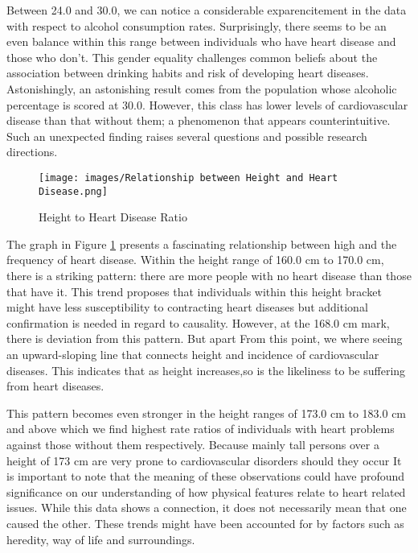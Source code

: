 \documentclass[12pt, a4paper,twoside]{report}
\numberwithin{equation}{chapter}
\begin{document}
Between 24.0 and 30.0, we can notice a considerable exparencitement in the data with respect to alcohol consumption rates. Surprisingly, there seems to be an even balance within this range between individuals who have heart disease and those who don't. This gender equality challenges common beliefs about the association between drinking habits and risk of developing heart diseases.
Astonishingly, an astonishing result comes from the population whose alcoholic percentage is scored at 30.0. However, this class has lower levels of cardiovascular disease than that without them; a phenomenon that appears counterintuitive. Such an unexpected finding raises several questions and possible research directions.


 \begin{figure}[h]
     \centering
     \texttt{[image: images/Relationship between Height and Heart Disease.png]}
     \caption{Height to Heart Disease Ratio}
     \label{fig:height-heart}
 \end{figure}

The graph in Figure \ref{fig:height-heart} presents a fascinating relationship between high and the frequency of heart disease. Within the height range of 160.0 cm to 170.0 cm, there is a striking pattern: there are more people with no heart disease than those that have it. This trend proposes that individuals within this height bracket might have less susceptibility to contracting heart diseases but additional confirmation is needed in regard to causality.
However, at the 168.0 cm mark, there is deviation from this pattern. But apart  From this point, we where seeing an upward-sloping line that connects height and incidence of cardiovascular diseases. This indicates that as height increases,so is the  likeliness to be suffering from heart diseases.

This pattern becomes even stronger in the height ranges of 173.0 cm to 183.0 cm and above which we find highest rate ratios of individuals with heart problems against those without them respectively. Because mainly tall persons over a height of 173 cm are very prone to cardiovascular disorders should they occur
It is important to note that the meaning of these observations could have profound significance on our understanding of how physical features relate to heart related issues. While this data shows a connection, it does not necessarily mean that one caused the other. These trends might have been accounted for by factors such as heredity, way of life and surroundings.
\end{document}
